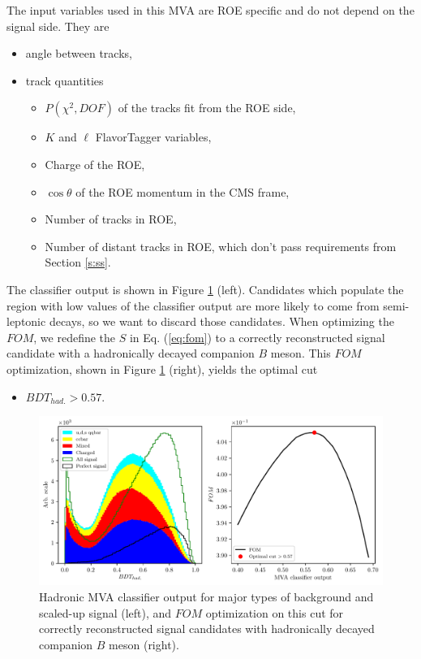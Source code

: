 \documentclass[oneside,a4paper,openany,12pt]{scrbook}
\begin{document}
The input variables used in this MVA are ROE specific and do not depend on the signal side. They are
\begin{itemize}
\item angle between tracks,
\item track quantities
	\begin{itemize}
	\item $P(\chi^2,DOF)$ of the tracks fit from the ROE side,
	\item $K$ and $\ell$ FlavorTagger variables,
	\item Charge of the ROE,
	\item $\cos \theta$ of the ROE momentum in the CMS frame,
	\item Number of tracks in ROE,
	\item Number of distant tracks in ROE, which don't pass requirements from Section \ref{s:ss}.
	\end{itemize}
\end{itemize}
%
The classifier output is shown in Figure \ref{fig:hdmva} (left). Candidates which populate the region with low values of the classifier output are more likely to come from semi-leptonic decays, so we want to discard those candidates. When optimizing the $FOM$, we redefine the $S$ in Eq. (\ref{eq:fom}) to a correctly reconstructed signal candidate with a hadronically decayed companion $B$ meson. This $FOM$ optimization, shown in Figure \ref{fig:hdmva} (right), yields the optimal cut
\begin{itemize}
\item $BDT_{had.} > 0.57.$
\end{itemize} 

\begin{figure}[H]
\centering
\captionsetup{width=0.8\linewidth}
\includegraphics[width=\linewidth]{fig/hdmva_opt}
\caption{Hadronic MVA classifier output for major types of background and scaled-up signal (left), and $FOM$ optimization on this cut for correctly reconstructed signal candidates with hadronically decayed companion $B$ meson (right).}
\label{fig:hdmva}
\end{figure}
\end{document}
